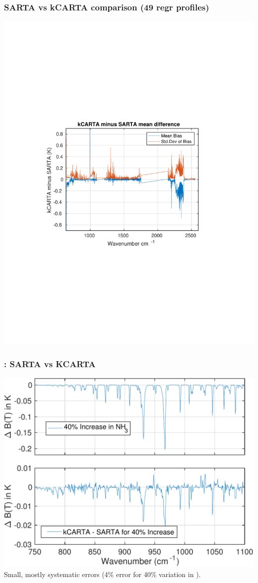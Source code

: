 \documentclass[10pt,t]{beamer}
\begin{document}
\begin{frame}\frametitle{SARTA vs kCARTA comparison (49 regr profiles)}
  \centering
  \includegraphics[width=0.95\linewidth]{./r49_kcarta_sarta_bias_std_spectrum.pdf}
\end{frame}
\begin{frame}\frametitle{\amm : SARTA vs KCARTA}
  \centering
  \includegraphics[width=0.9\linewidth]{lls_nh3.pdf} \newline Small, mostly
  systematic errors (4\% error for 40\% variation in \amm).
\end{frame}
\end{document}

